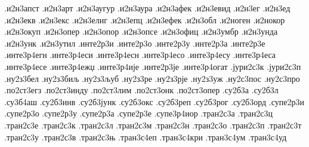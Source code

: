 {.и2н3апст
.и2н3арт
.и2н3аугур
.и2н3аура
.и2н3афек
.и2н3евид
.и2н3ег
.и2н3ед
.и2н3екв
.и2н3екс
.и2н3елиг
.и2н3епц
.и2н3ефек
.и2н3обл
.и2ноген
.и2нокор
.и2н3окуп
.и2н3опер
.и2н3опор
.и2н3опсе
.и2н3офиц
.и2н3умбр
.и2н3унда
.и2н3унк
.и2н3утил
.инте2р3и
.инте2р3о
.инте2р3у
.инте2р3а
.инте2р3е
.инте3р4егн
.инте3р4еси
.инте3р4есн
.инте3р4есо
.инте3р4есу
.инте3р4еса
.инте3р4есе
.инте3р4ежџ
.инте3р4ије
.инте2р3је
.инте3р4огат
.јури2с3к
.јури2с3п
.ну2з3бел
.ну2з3биљ
.ну2з3љуб
.ну2з3ре
.ну2з3рје
.ну2з3уж
.ну2с3пос
.ну2с3про
.по2ст3егз
.по2ст3инду
.по2ст3лим
.по2ст3онк
.по2ст3опер
.су2б3а
.су2б3л
.су3б4аш
.су2б3инв
.су2б3јунк
.су2б3окс
.су2б3реп
.су2б3рог
.су2б3орд
.супе2р3и
.супе2р3о
.супе2р3у
.супе2р3а
.супе2р3е
.супе3р4иор
.тран2с3а
.тран2с3ц
.тран2с3е
.тран2с3к
.тран2с3л
.тран2с3м
.тран2с3н
.тран2с3о
.тран2с3п
.тран2с3т
.тран2с3у
.тран2с3в
.тран2с3њ
.тран3с4еп
.тран3с4кри
.тран3с4ум
.тран3с4уд
}
%

